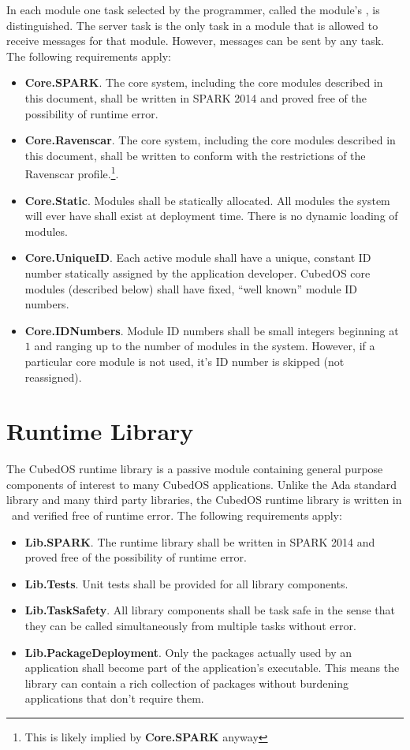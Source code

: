 In each module one task selected by the programmer, called the module's ,
is distinguished. The server task is the only task in a module that is allowed to receive
messages for that module. However, messages can be sent by any task. The following requirements
apply:

\begin{itemize}
\item \textbf{Core.SPARK}. The core system, including the core modules described in this
  document, shall be written in SPARK 2014 and proved free of the possibility of runtime error.
\item \textbf{Core.Ravenscar}. The core system, including the core modules described in this
  document, shall be written to conform with the restrictions of the Ravenscar
  profile.\footnote{This is likely implied by \textbf{Core.SPARK} anyway}.
\item \textbf{Core.Static}. Modules shall be statically allocated. All modules the system will
  ever have shall exist at deployment time. There is no dynamic loading of modules. 
\item \textbf{Core.UniqueID}. Each active module shall have a unique, constant ID number
  statically assigned by the application developer. CubedOS core modules (described below) shall
  have fixed, ``well known'' module ID numbers.
\item \textbf{Core.IDNumbers}. Module ID numbers shall be small integers beginning at $1$ and
  ranging up to the number of modules in the system. However, if a particular core module is not
  used, it's ID number is skipped (not reassigned).
\end{itemize}

\section{Runtime Library}
\label{sec:runtime-library}

The CubedOS runtime library is a passive module containing general purpose components of
interest to many CubedOS applications. Unlike the Ada standard library and many third party
libraries, the CubedOS runtime library is written in \SPARK\ and verified free of runtime error.
The following requirements apply:

\begin{itemize}
\item \textbf{Lib.SPARK}. The runtime library shall be written in SPARK 2014 and proved free of
  the possibility of runtime error.
\item \textbf{Lib.Tests}. Unit tests shall be provided for all library components.
\item \textbf{Lib.TaskSafety}. All library components shall be task safe in the sense that they
  can be called simultaneously from multiple tasks without error.
\item \textbf{Lib.PackageDeployment}. Only the packages actually used by an application shall
  become part of the application's executable. This means the library can contain a rich
  collection of packages without burdening applications that don't require them.
\end{itemize}

